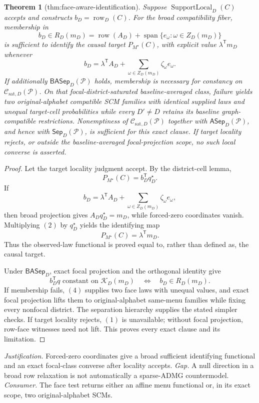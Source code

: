 \documentclass{article}
\newtheorem{theorem}{Theorem}
\begin{document}
\begin{theorem}[thm:face-aware-identification]\label{thm:face-aware-identification}
Suppose \(\operatorname{SupportLocal}_D(C)\) accepts and constructs \(b_D=\operatorname{row}_D(C)\).  For the broad compatibility fiber, membership in
\[
b_D\in R_D(m_D)
=\operatorname{row}(A_D)+
\operatorname{span}\{e_\omega:\omega\in Z_D(m_D)\}
\]
is sufficient to identify the causal target \(P_{M^\star}(C)\), with explicit value \(\lambda^{\mathsf T}m_D\) whenever
\[
b_D=\lambda^{\mathsf T}A_D+
\sum_{\omega\in Z_D(m_D)}\zeta_\omega e_\omega.
\]
If additionally \(\mathsf{BASep}_D(\mathcal P)\) holds, membership is necessary for constancy on \(\mathcal C_{\mathrm{sat},D}(\mathcal P)\).  On that focal-district-saturated baseline-averaged class, failure yields two original-alphabet compatible SCM families with identical supplied laws and unequal target-cell probabilities while every \(D'\ne D\) retains its baseline graph-compatible restrictions.  Nonemptiness of \(\mathcal C_{\mathrm{sat},D}(\mathcal P)\) together with \(\mathsf{ASep}_D(\mathcal P)\), and hence with \(\mathsf{Sep}_D(\mathcal P)\), is sufficient for this exact clause.  If target locality rejects, or outside the baseline-averaged focal-projection scope, no such local converse is asserted.
\end{theorem}
\begin{proof}
Let the target locality judgment accept.  By the district-cell lemma,
\[
P_{M^\star}(C)=b_D^{\mathsf T}q_D^\star.
\tag{1}
\]
If
\[
b_D=\lambda^{\mathsf T}A_D+
\sum_{\omega\in Z_D(m_D)}\zeta_\omega e_\omega,
\tag{2}
\]
then broad projection gives \(A_Dq_D^\star=m_D\), while forced-zero coordinates vanish.  Multiplying \((2)\) by \(q_D^\star\) yields the identifying map
\[
P_{M^\star}(C)=\lambda^{\mathsf T}m_D.
\tag{3}
\]
Thus the observed-law functional is proved equal to, rather than defined as, the causal target.

Under \(\mathsf{BASep}_D\), exact focal projection and the orthogonal identity give
\[
b_D^{\mathsf T}q\text{ constant on }\mathcal K_D(m_D)
\quad\Longleftrightarrow\quad b_D\in R_D(m_D).
\tag{4}
\]
If membership fails, \((4)\) supplies two face laws with unequal values, and exact focal projection lifts them to original-alphabet same-menu families while fixing every nonfocal district.  The separation hierarchy supplies the stated simpler checks.  If target locality rejects, \((1)\) is unavailable; without focal projection, row-face witnesses need not lift.  This proves every exact clause and its limitation.
\end{proof}
\par\smallskip\noindent \textit{Justification.} Forced-zero coordinates give a broad sufficient identifying functional and an exact focal-class converse after locality accepts. \textit{Gap.} A null direction in a broad row relaxation is not automatically a sparse-ADMG countermodel. \textit{Consumer.} The face test returns either an affine menu functional or, in its exact scope, two original-alphabet SCMs.
\end{document}

